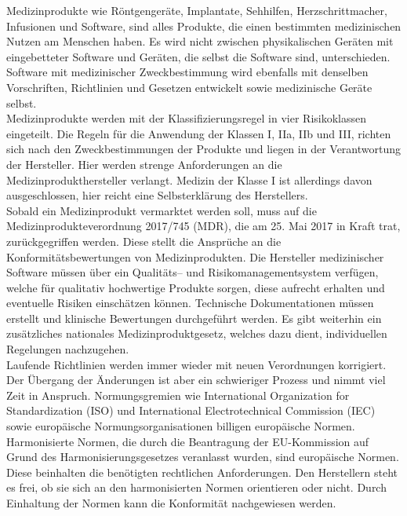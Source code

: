 Medizinprodukte wie Röntgengeräte, Implantate, Sehhilfen, Herzschrittmacher, 
Infusionen und Software, sind alles Produkte, die einen bestimmten medizinischen Nutzen am Menschen haben.
Es wird nicht zwischen physikalischen Geräten mit eingebetteter Software und Geräten, die selbst die Software sind, unterschieden. 
Software mit medizinischer Zweckbestimmung wird ebenfalls mit denselben Vorschriften, Richtlinien und Gesetzen entwickelt sowie medizinische Geräte selbst.\cite{AI_in_EU}\\
Medizinprodukte werden mit der Klassifizierungsregel in vier Risikoklassen eingeteilt. 
Die Regeln für die Anwendung der Klassen I, IIa, IIb und III, 
richten sich nach den Zweckbestimmungen der Produkte und liegen in der Verantwortung der Hersteller. Hier werden strenge Anforderungen an die Medizinprodukthersteller verlangt. 
Medizin der Klasse I ist allerdings davon ausgeschlossen, hier reicht eine Selbsterklärung des Herstellers.\\
Sobald ein Medizinprodukt vermarktet werden soll, 
muss auf die Medizinprodukteverordnung 2017/745 (MDR), 
die am 25. Mai 2017 in Kraft trat, zurückgegriffen werden. 
Diese stellt die Ansprüche an die Konformitätsbewertungen von Medizinprodukten. 
Die Hersteller medizinischer Software müssen über ein Qualitäts-- und Risikomanagementsystem verfügen, welche für qualitativ hochwertige Produkte sorgen, 
diese aufrecht erhalten und eventuelle Risiken einschätzen können. 
Technische Dokumentationen müssen erstellt und klinische Bewertungen durchgeführt werden. 
Es gibt weiterhin ein zusätzliches nationales Medizinproduktgesetz, 
welches dazu dient, individuellen Regelungen nachzugehen.\cite{AI_in_EU}\\
Laufende Richtlinien werden immer wieder mit neuen Verordnungen korrigiert. 
Der Übergang der Änderungen ist aber ein schwieriger Prozess und nimmt viel Zeit in Anspruch.
Normungsgremien wie International Organization for Standardization (ISO) und International Electrotechnical Commission (IEC) sowie europäische Normungsorganisationen billigen europäische Normen. 
Harmonisierte Normen, die durch die Beantragung der EU-Kommission auf Grund des Harmonisierungsgesetzes veranlasst wurden, 
sind europäische Normen. Diese beinhalten die benötigten rechtlichen Anforderungen. Den Herstellern steht es frei, 
ob sie sich an den harmonisierten Normen orientieren oder nicht. Durch Einhaltung der Normen kann die Konformität nachgewiesen werden.\cite{AI_in_EU}\\
